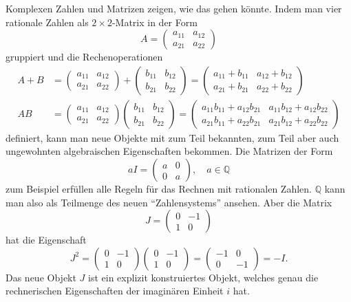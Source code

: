 Komplexen Zahlen und Matrizen zeigen, wie das gehen könnte.
%
Indem man vier rationale Zahlen als $2\times 2$-Matrix in der Form
\[
A=
\begin{pmatrix}
a_{11}&a_{12}\\
a_{21}&a_{22}
\end{pmatrix}
\]
gruppiert und die Rechenoperationen
\begin{align*}
A+B
&=
\begin{pmatrix}
a_{11}&a_{12}\\
a_{21}&a_{22}
\end{pmatrix}
+
\begin{pmatrix}
b_{11}&b_{12}\\
b_{21}&b_{22}
\end{pmatrix}
=
\begin{pmatrix}
a_{11}+b_{11}&a_{12}+b_{12}\\
a_{21}+b_{21}&a_{22}+b_{22}
\end{pmatrix}
\\
AB
&=
\begin{pmatrix}
a_{11}&a_{12}\\
a_{21}&a_{22}
\end{pmatrix}
\begin{pmatrix}
b_{11}&b_{12}\\
b_{21}&b_{22}
\end{pmatrix}
=
\begin{pmatrix}
a_{11}b_{11} + a_{12}b_{21} & a_{11}b_{12} + a_{12}b_{22} \\
a_{21}b_{11} + a_{22}b_{21} & a_{21}b_{12} + a_{22}b_{22}
\end{pmatrix}
\end{align*}
definiert, kann man neue Objekte mit zum Teil bekannten, zum Teil
aber auch ungewohnten algebraischen Eigenschaften bekommen.
Die Matrizen der Form
\[
aI
=
\begin{pmatrix} a&0\\0&a \end{pmatrix},
\quad
a\in\mathbb{Q}
\]
zum Beispiel erfüllen alle Regeln für das Rechnen mit rationalen Zahlen.
$\mathbb{Q}$ kann man also als Teilmenge des neuen ``Zahlensystems'' ansehen.
Aber die Matrix
\[
J
=
\begin{pmatrix} 0&-1\\1&0 \end{pmatrix}
\]
hat die Eigenschaft
\[
J^2 = 
\begin{pmatrix} 0&-1\\1&0 \end{pmatrix}
\begin{pmatrix} 0&-1\\1&0 \end{pmatrix}
=
\begin{pmatrix} -1&0\\0&-1\end{pmatrix}
=
-I.
\]
Das neue Objekt $J$ ist ein explizit konstruiertes Objekt, welches
genau die rechnerischen Eigenschaften der imaginären Einheit $i$ hat.

